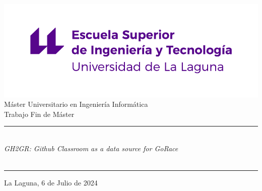 \pagestyle{empty}
\thispagestyle{empty}


\newcommand{\HRule}{\rule{\linewidth}{1mm}}
\setlength{\parindent}{0mm}
\setlength{\parskip}{0mm}




\begin{center}
\includegraphics[scale=0.8]{images/escuela-ingenieria-tecnologia-original}\\[10mm]
{\Large Máster Universitario en Ingeniería Informática}
\\[5mm]
{\Large Trabajo Fin de Máster}
\end{center}

\HRule
\begin{flushright}
        {\Huge \tfgTitle } \\[2.5mm]
        {\Large \textit{GH2GR: Github Classroom as a data source for GoRace}} \\[5mm]
        {\Large \tfgStudentName} \\[5mm]
\end{flushright}
\HRule
{}
\begin{center}
  \Large La Laguna, 6 de Julio de 2024
\end{center}